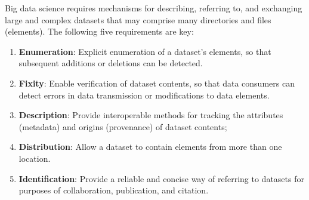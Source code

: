 \documentclass[11pt]{article}
\begin{document}
%
Big data science requires mechanisms for describing, referring to,
and exchanging large  and complex datasets that may comprise many directories and files (elements).
The following five requirements are key:
\begin{enumerate}
\itemsep0em 
\item
\textbf{Enumeration}: Explicit enumeration of a dataset's elements, so that
subsequent additions or deletions can be detected.
\item
\textbf{Fixity}: Enable verification of dataset contents, 
so that data consumers can detect errors in data transmission or modifications to data elements.
\item
\textbf{Description}: Provide interoperable methods for tracking the attributes (metadata) and origins (provenance) of dataset contents; 
\item
\textbf{Distribution}: Allow a dataset to contain elements from more than one location.
\item
\textbf{Identification}: Provide a reliable and concise way of referring to datasets for purposes of collaboration, publication, and citation.
\end{enumerate}
\end{document}
